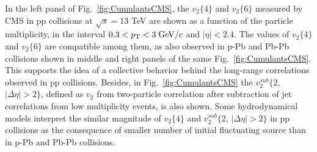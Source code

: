 In the left panel of Fig.~\ref{fig:CumulantsCMS}, the $v_2 \{4\}$ and $v_2 \{6\}$ measured by CMS in pp collisions at $\sqrt{s} = 13$ TeV are shown as a function of the particle multiplicity, in the interval $0.3 < p_{\rm T} < 3 \; \mathrm{GeV}/c$ and $|\eta| < 2.4$. The values of $v_2 \{4\}$ and $v_2 \{6\}$ are compatible among them, as also observed in p-Pb and Pb-Pb collisions shown in middle and right panels of the same Fig.~\ref{fig:CumulantsCMS}. This supports the idea of a collective behavior behind the long-range correlations observed in pp collisions. Besides, in Fig.~\ref{fig:CumulantsCMS} the $v_2^{sub} \{2$, $|\Delta \eta| > 2\}$, defined as $v_2$ from two-particle correlation after subtraction of jet correlations from low multiplicity events, is also shown. Some hydrodynamical models interpret the similar magnitude of $v_2 \{4\}$ and $v_2^{sub} \{2$, $|\Delta \eta| > 2\}$ in pp collisions as the consequence of smaller number of initial fluctuating source than in p-Pb and Pb-Pb collisions.\\
